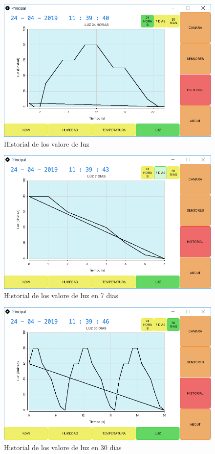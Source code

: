 \documentclass[12pt]{article}
\begin{document}
\begin{figure}[H]
	\centering
	\includegraphics[scale=.6]{historial24h}
	\caption{Historial de los valore de luz}
	\label{fig:historia24h}
\end{figure}

\begin{figure}[H]
	\centering
	\includegraphics[scale=.6]{historial7d}
	\caption{Historial de los valore de luz en 7 dias}
	\label{fig:historial7d}
\end{figure}

\begin{figure}[H]
	\centering
	\includegraphics[scale=.6]{historial30d}
	\caption{Historial de los valore de luz en 30 dias}
	\label{fig:historia30d}
\end{figure}
\end{document}
